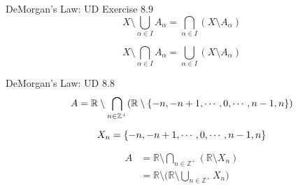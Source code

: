 % 
% 

\begin{frame}{}
  \begin{exampleblock}{DeMorgan's Law: UD Exercise $8.9$}
    \[
      X \setminus \bigcup_{\alpha \in I} A_{\alpha} = \bigcap_{\alpha \in I} (X \setminus A_{\alpha})
    \]

    \[
      X \setminus \bigcap_{\alpha \in I} A_{\alpha} = \bigcup_{\alpha \in I} (X \setminus A_{\alpha})
    \]
  \end{exampleblock}
\end{frame}

\begin{frame}{}
  \begin{exampleblock}{DeMorgan's Law: UD $8.8$}
    \[
      A = \mathbb{R} \setminus \bigcap_{n \in \mathbb{Z}^{+}} (\mathbb{R} \setminus \{-n, -n+1, \cdots, 0, \cdots, n-1, n\})
    \]
  \end{exampleblock}

  \pause
  \[
    X_n = \{-n, -n+1, \cdots, 0, \cdots, n-1, n\}
  \]

  \pause
  \begin{align*}
     A &= \mathbb{R} \setminus \bigcap_{n \in \mathbb{Z}^{+}} (\mathbb{R} \setminus X_n)\\
       &= \mathbb{R} \setminus \Big(\mathbb{R} \setminus \bigcup_{n \in \mathbb{Z}^{+}} X_n \Big) \\
  \end{align*}
\end{frame}

